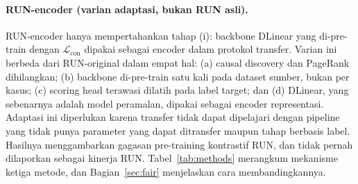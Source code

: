 \paragraph{RUN-encoder (varian adaptasi, bukan RUN asli).} RUN-encoder hanya mempertahankan tahap (i): backbone DLinear yang di-pre-train dengan $\mathcal{L}_{\mathrm{con}}$ dipakai sebagai encoder dalam protokol transfer. Varian ini berbeda dari RUN-original dalam empat hal: (a) causal discovery dan PageRank dihilangkan; (b) backbone di-pre-train satu kali pada dataset sumber, bukan per kasus; (c) scoring head terawasi dilatih pada label target; dan (d) DLinear, yang sebenarnya adalah model peramalan, dipakai sebagai encoder representasi. Adaptasi ini diperlukan karena transfer tidak dapat dipelajari dengan pipeline yang tidak punya parameter yang dapat ditransfer maupun tahap berbasis label. Hasilnya menggambarkan gagasan pre-training kontrastif RUN, dan tidak pernah dilaporkan sebagai kinerja RUN. 
Tabel~\ref{tab:methods} merangkum mekanisme ketiga metode, dan Bagian~\ref{sec:fair} menjelaskan cara membandingkannya.


